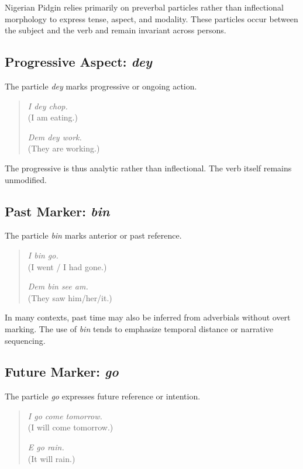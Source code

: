 \documentclass[12pt]{article}
\begin{document}
Nigerian Pidgin relies primarily on preverbal particles rather than inflectional morphology to express tense, aspect, and modality. These particles occur between the subject and the verb and remain invariant across persons.

\subsection{Progressive Aspect: \textit{dey}}

The particle \textit{dey} marks progressive or ongoing action.

\begin{quote}
\textit{I dey chop.} \\
(I am eating.)

\textit{Dem dey work.} \\
(They are working.)
\end{quote}

The progressive is thus analytic rather than inflectional. The verb itself remains unmodified.

\subsection{Past Marker: \textit{bin}}

The particle \textit{bin} marks anterior or past reference.

\begin{quote}
\textit{I bin go.} \\
(I went / I had gone.)

\textit{Dem bin see am.} \\
(They saw him/her/it.)
\end{quote}

In many contexts, past time may also be inferred from adverbials without overt marking. The use of \textit{bin} tends to emphasize temporal distance or narrative sequencing.

\subsection{Future Marker: \textit{go}}

The particle \textit{go} expresses future reference or intention.

\begin{quote}
\textit{I go come tomorrow.} \\
(I will come tomorrow.)

\textit{E go rain.} \\
(It will rain.)
\end{quote}
\end{document}
